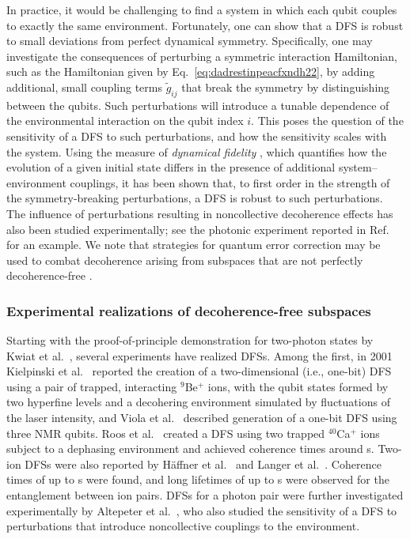 \documentclass[3p,sort&compress,12pt]{elsarticle}
\begin{document}
In practice, it would be challenging to find a system in which each qubit couples to exactly the same environment. Fortunately, one can show that a DFS is robust to small deviations from perfect dynamical symmetry. Specifically, one may investigate the consequences of perturbing a symmetric interaction Hamiltonian, such as the Hamiltonian given by Eq.~\eqref{eq:dadrestinpeacfxndh22}, by adding additional, small coupling terms $\widetilde{g}_{ij}$ that break the symmetry by distinguishing between the qubits. Such perturbations will introduce a tunable dependence of the environmental interaction on the qubit index $i$. This poses the question of the sensitivity of a DFS to such perturbations, and how the sensitivity scales with the system. Using the measure of \emph{dynamical fidelity} \cite{Lidar:1998:uu,Bacon:1999:aq}, which quantifies how the evolution of a given initial state differs in the presence of additional system--environment couplings, it has been shown \cite{Lidar:1998:uu,Bacon:1999:aq,Kattemolle:2018:ii} that, to first order in the strength of the symmetry-breaking perturbations, a DFS is robust to such perturbations. The influence of perturbations resulting in noncollective decoherence effects has also been studied experimentally; see the photonic experiment reported in Ref.~\cite{Altepeter:2004:ll} for an example. We note that strategies for quantum error correction \cite{Steane:1996:cd,Shor:1995:rx,Steane:2001:dx,Knill:2002:rx,Nielsen:2000:tt,Lidar:2013:pp} may be used to combat decoherence arising from subspaces that are not perfectly decoherence-free \cite{Lidar:1999:fa}.

\subsubsection{Experimental realizations of decoherence-free subspaces}

Starting with the proof-of-principle demonstration for two-photon states by Kwiat et al.\ \cite{Kwiat:2000:kv}, several experiments have realized DFSs. Among the first, in 2001 Kielpinski et al.\ \cite{Kielpinski:2001:uu} reported the creation of a two-dimensional (i.e., one-bit) DFS using a pair of trapped, interacting $^9$Be$^+$ ions, with the qubit states formed by two hyperfine levels and a decohering environment simulated by fluctuations of the laser intensity, and Viola et al.\ \cite{Viola:2001:ra} described generation of a one-bit DFS using three NMR qubits. Roos et al.\ \cite{Roos:204:pp} created a DFS using two trapped $^{40}$Ca$^+$ ions subject to a dephasing environment and achieved coherence times around \unit[1]{s}. Two-ion DFSs were also reported by H{\"a}ffner et al.\ \cite{Haffner:2005:zz} and Langer et al.\ \cite{Langer:2005:uu}. Coherence times of up to \unit[34]{s} were found, and long lifetimes of up to \unit[20]{s} were observed for the entanglement between ion pairs. DFSs for a photon pair were further investigated experimentally by Altepeter et al.\ \cite{Altepeter:2004:ll}, who also studied the sensitivity of a DFS to perturbations that introduce noncollective couplings to the environment. 
\end{document}
